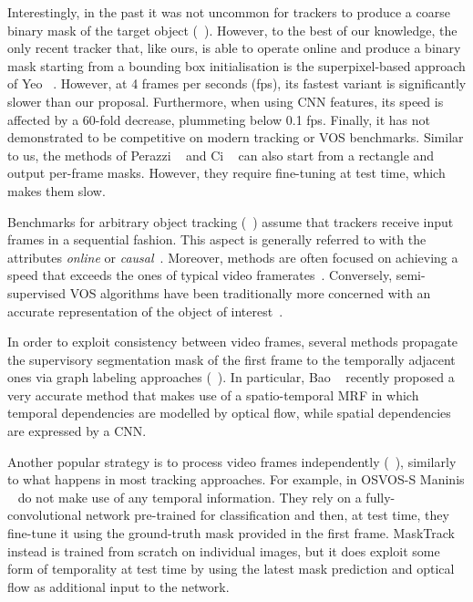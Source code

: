 Interestingly, in the past it was not uncommon for trackers to produce a coarse binary mask of the target object (\eg~\cite{comaniciu2000real,perez2002color}).
However, to the best of our knowledge, the only recent tracker that, like ours, is able to operate online and produce a binary mask starting from a bounding box initialisation is the superpixel-based approach of Yeo \etal~\cite{yeo2017superpixel}.
However, at 4 frames per seconds (fps), its fastest variant is significantly slower than our proposal.
Furthermore, when using CNN features, its speed is affected by a 60-fold decrease, plummeting below 0.1 fps.
Finally, it has not demonstrated to be competitive on modern tracking or VOS benchmarks.
Similar to us, the methods of Perazzi \etal~\cite{perazzi2017learning} and Ci \etal~\cite{ci2018video} can also start from a rectangle and output per-frame masks.
However, they require fine-tuning at test time, which makes them slow.

Benchmarks for arbitrary object tracking (\eg~\cite{smeulders2014visual,kristan2016visual,wu2013online}) assume that trackers receive input frames in a sequential fashion.
This aspect is generally referred to with the attributes \emph{online} or \emph{causal}~\cite{kristan2016visual}.
Moreover, methods are often focused on achieving a speed that exceeds the ones of typical video framerates~\cite{VOT2018}.
Conversely, semi-supervised VOS algorithms have been traditionally more concerned with an accurate representation of the object of interest~\cite{perazzi2017video,perazzi2016benchmark}.

In order to exploit consistency between video frames, several methods propagate the supervisory segmentation mask of the first frame to the temporally adjacent ones via graph labeling approaches (\eg~\cite{wen2015jots,perazzi2015fully,tsai2016video,marki2016bilateral,bao2018cnn}). 
In particular, Bao \etal~\cite{bao2018cnn} recently proposed a very accurate method that makes use of a spatio-temporal MRF in which temporal dependencies are modelled by optical flow, while spatial dependencies are expressed by a CNN.

Another popular strategy is to process video frames independently (\eg~\cite{maninis2017video,perazzi2017learning,voigtlaender2017online}), similarly to what happens in most tracking approaches.
For example, in OSVOS-S Maninis \etal~\cite{maninis2017video} do not make use of any temporal information.
They rely on a fully-convolutional network pre-trained for classification and then, at test time, they fine-tune it using the ground-truth mask provided in the first frame.
MaskTrack~\cite{perazzi2017learning} instead is trained from scratch on individual images, but it does exploit some form of temporality at test time by using the latest mask prediction and optical flow as additional input to the network.

